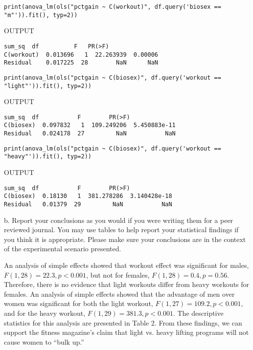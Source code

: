 \documentclass[onecolumn,10pt]{jhwhw}
\begin{document}
\begin{lstlisting}
print(anova_lm(ols("pctgain ~ C(workout)", df.query('biosex == "m"')).fit(), typ=2))
\end{lstlisting}
\noindent OUTPUT
\begin{lstlisting}[language={}]
              sum_sq  df          F   PR(>F)
C(workout)  0.013696   1  22.263939  0.00006
Residual    0.017225  28        NaN      NaN
\end{lstlisting}

\begin{lstlisting}
print(anova_lm(ols("pctgain ~ C(biosex)", df.query('workout == "light"')).fit(), typ=2))
\end{lstlisting}
\noindent OUTPUT
\begin{lstlisting}[language={}]
             sum_sq  df           F        PR(>F)
C(biosex)  0.097832   1  109.249206  5.450883e-11
Residual   0.024178  27         NaN           NaN
\end{lstlisting}

\begin{lstlisting}
print(anova_lm(ols("pctgain ~ C(biosex)", df.query('workout == "heavy"')).fit(), typ=2))
\end{lstlisting}
\noindent OUTPUT
\begin{lstlisting}[language={}]
            sum_sq  df           F        PR(>F)
C(biosex)  0.18130   1  381.278286  3.140428e-18
Residual   0.01379  29         NaN           NaN
\end{lstlisting}

b. Report your conclusions as you would if you were writing them for a peer reviewed journal. You may use tables to help report your statistical findings if you think it is appropriate. Please make sure your conclusions are in the context of the experimental scenario presented.

An analysis of simple effects showed that workout effect was significant for males, $F(1, 28) = 22.3, p < 0.001$, but not for females, $F(1, 28) = 0.4, p = 0.56$. Therefore, there is no evidence that light workouts differ from heavy workouts for females. An analysis of simple effects showed that the advantage of men over women was significant for both the light workout, $F(1, 27) = 109.2, p < 0.001$, and for the heavy workout, $F(1, 29) = 381.3, p < 0.001$. The descriptive statistics for this analysis are presented in Table 2. From these findings, we can support the fitness magazine's claim that light vs. heavy lifting programs will not cause women to ``bulk up.''
\end{document}

